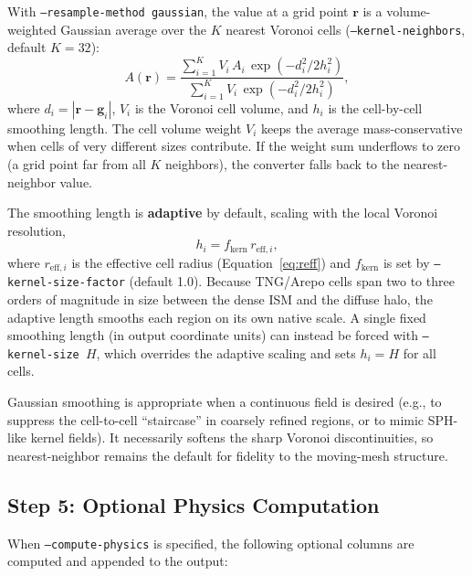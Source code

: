 \documentclass[english,a4paper]{my_memo}
\begin{document}
With \texttt{--resample-method gaussian}, the value at a grid point
$\mathbf{r}$ is a volume-weighted Gaussian average over the $K$ nearest
Voronoi cells (\texttt{--kernel-neighbors}, default $K=32$):
\begin{equation}
A(\mathbf{r}) =
  \frac{\sum_{i=1}^{K} V_i\,A_i\,
        \exp\!\left(-d_i^2 / 2 h_i^2\right)}
       {\sum_{i=1}^{K} V_i\,
        \exp\!\left(-d_i^2 / 2 h_i^2\right)},
\label{eq:gauss_gather}
\end{equation}
where $d_i = |\mathbf{r} - \mathbf{g}_i|$, $V_i$ is the Voronoi cell
volume, and $h_i$ is the cell-by-cell smoothing length.  The cell volume
weight $V_i$ keeps the average mass-conservative when cells of very
different sizes contribute.  If the weight sum underflows to zero (a
grid point far from all $K$ neighbors), the converter falls back to the
nearest-neighbor value.

The smoothing length is \textbf{adaptive} by default, scaling with the
local Voronoi resolution,
\begin{equation}
h_i = f_\mathrm{kern}\,r_{\mathrm{eff},i},
\label{eq:adaptive_h}
\end{equation}
where $r_{\mathrm{eff},i}$ is the effective cell radius
(Equation~\ref{eq:reff}) and $f_\mathrm{kern}$ is set by
\texttt{--kernel-size-factor} (default 1.0).  Because TNG/Arepo cells
span two to three orders of magnitude in size between the dense ISM and
the diffuse halo, the adaptive length smooths each region on its own
native scale.  A single fixed smoothing length (in output coordinate
units) can instead be forced with \texttt{--kernel-size~$H$}, which
overrides the adaptive scaling and sets $h_i = H$ for all cells.

Gaussian smoothing is appropriate when a continuous field is desired
(e.g., to suppress the cell-to-cell ``staircase'' in coarsely refined
regions, or to mimic SPH-like kernel fields).  It necessarily softens
the sharp Voronoi discontinuities, so nearest-neighbor remains the
default for fidelity to the moving-mesh structure.

\subsection{Step 5: Optional Physics Computation}

When \texttt{--compute-physics} is specified, the following optional
columns are computed and appended to the output:
\end{document}
